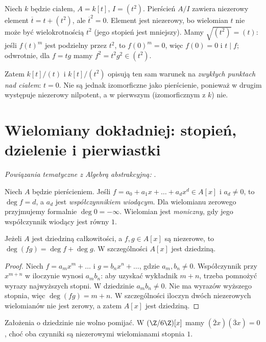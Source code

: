 \begin{przyklad}
Niech $k$ będzie ciałem, $A=k[t]$, $I=(t^2)$.
Pierścień $A/I$ zawiera niezerowy element $\overline t=t+(t^2)$,
ale $\overline t^2=0$. Element jest niezerowy,
bo wielomian $t$ nie może być wielokrotnością $t^2$
(jego stopień jest mniejszy).
Mamy $\sqrt{(t^2)}=(t)$: jeśli $f(t)^m$ jest podzielny przez $t^2$,
to $f(0)^m=0$, więc $f(0)=0$ i $t\mid f$;
odwrotnie, dla $f=tg$ mamy $f^2=t^2g^2\in(t^2)$.

Zatem $k[t]/(t)$ i $k[t]/(t^2)$ opisują ten sam warunek
na \emph{zwykłych punktach nad ciałem}: $t=0$.
Nie są jednak izomorficzne jako pierścienie, ponieważ w drugim
występuje niezerowy nilpotent, a w pierwszym (izomorficznym z $k$) nie.
\end{przyklad}

\section{Wielomiany dokładniej: stopień, dzielenie i pierwiastki}

\noindent\emph{Powiązania tematyczne z Algebrą abstrakcyjną:} .


\begin{definicja}
Niech $A$ będzie pierścieniem. Jeśli
$f=a_0+a_1x+\dots+a_dx^d\in A[x]$ i $a_d\ne0$,
to $\deg f=d$, a $a_d$ jest \emph{współczynnikiem wiodącym}.
Dla wielomianu zerowego przyjmujemy formalnie $\deg0=-\infty$.
Wielomian jest \emph{moniczny}, gdy jego współczynnik wiodący jest równy $1$.
\end{definicja}

\begin{stwierdzenie}
Jeżeli $A$ jest dziedziną całkowitości, a $f,g\in A[x]$ są niezerowe,
to $\deg(fg)=\deg f+\deg g$. W szczególności $A[x]$ jest dziedziną.
\end{stwierdzenie}
\begin{proof}
Niech $f=a_mx^m+\dots$ i $g=b_nx^n+\dots$, gdzie $a_m,b_n\ne0$.
Współczynnik przy $x^{m+n}$ w iloczynie wynosi $a_mb_n$:
aby uzyskać wykładnik $m+n$, trzeba pomnożyć wyrazy najwyższych stopni.
W dziedzinie $a_mb_n\ne0$. Nie ma wyrazów wyższego stopnia,
więc $\deg(fg)=m+n$. W szczególności iloczyn dwóch niezerowych
wielomianów nie jest zerowy, a zatem $A[x]$ jest dziedziną.
\end{proof}

\begin{uwaga}
Założenia o dziedzinie nie wolno pomijać. W $(\Z/6\Z)[x]$
mamy $(\overline2x)(\overline3x)=0$, choć oba czynniki są
niezerowymi wielomianami stopnia $1$.
\end{uwaga}

